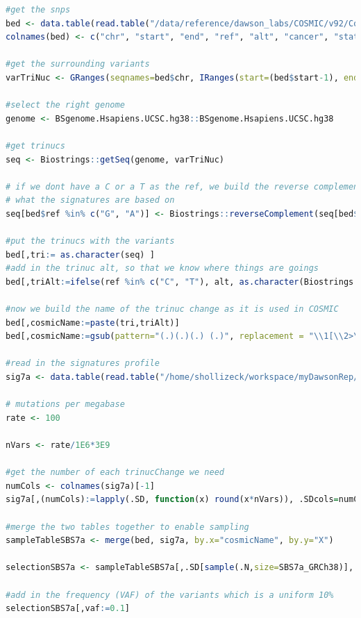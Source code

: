 \begin{lstlisting}[language=R, caption=spike-in variant selection, label={lst-mmfAppendix:spikeInSelect}]
#get the snps
bed <- data.table(read.table("/data/reference/dawson_labs/COSMIC/v92/CosmicMutantSNPs.bed", sep="\t"))
colnames(bed) <- c("chr", "start", "end", "ref", "alt", "cancer", "status")

#get the surrounding variants
varTriNuc <- GRanges(seqnames=bed$chr, IRanges(start=(bed$start-1), end=(bed$end+1)))

#select the right genome
genome <- BSgenome.Hsapiens.UCSC.hg38::BSgenome.Hsapiens.UCSC.hg38

#get trinucs
seq <- Biostrings::getSeq(genome, varTriNuc)

# if we dont have a C or a T as the ref, we build the reverse complement, because thats
# what the signatures are based on
seq[bed$ref %in% c("G", "A")] <- Biostrings::reverseComplement(seq[bed$ref %in% c("G", "A")])

#put the trinucs with the variants
bed[,tri:= as.character(seq) ]
#add in the trinuc alt, so that we know where things are goings
bed[,triAlt:=ifelse(ref %in% c("C", "T"), alt, as.character(Biostrings::complement(Biostrings::DNAStringSet(bed$alt))))]

#now we build the name of the trinuc change as it is used in COSMIC
bed[,cosmicName:=paste(tri,triAlt)]
bed[,cosmicName:=gsub(pattern="(.)(.)(.) (.)", replacement = "\\1[\\2>\\4]\\3", cosmicName)]

#read in the signatures profile
sig7a <- data.table(read.table("/home/shollizeck/workspace/myDawsonRep/TMB/v3.2_SBS7a_PROFILE.txt", header=T, sep="\t"))

# mutations per megabase
rate <- 100

nVars <- rate/1E6*3E9

#get the number of each trinucChange we need
numCols <- colnames(sig7a)[-1]
sig7a[,(numCols):=lapply(.SD, function(x) round(x*nVars)), .SDcols=numCols]

#merge the two tables together to enable sampling
sampleTableSBS7a <- merge(bed, sig7a, by.x="cosmicName", by.y="X")

selectionSBS7a <- sampleTableSBS7a[,.SD[sample(.N,size=SBS7a_GRCh38)], by="cosmicName"]

#add in the frequency (VAF) of the variants which is a uniform 10%
selectionSBS7a[,vaf:=0.1]
\end{lstlisting}

